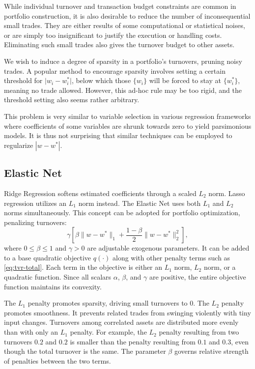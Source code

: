 \documentclass[11pt, letterpaper]{article}
\begin{document}
While individual turnover and transaction budget constraints are common in portfolio construction, it is also desirable to
reduce the number of inconsequential small trades. They are either results of some computational or statistical noises, or are
simply too insignificant to justify the execution or handling costs. Eliminating such small trades also gives the turnover
budget to other assets.

We wish to induce a degree of sparsity in a portfolio's turnovers, pruning noisy trades. A popular method to encourage sparsity
involves setting a certain threshold for $\lvert w_i - w^*_i \rvert$, below which those $\{w_i\}$ will be forced to stay at
$\{w_i^*\}$, meaning no trade allowed. However, this ad-hoc rule may be too rigid, and the threshold setting also seems rather
arbitrary.

This problem is very similar to variable selection in various regression frameworks where coefficients of some variables are
shrunk towards zero to yield parsimonious models. It is thus not surprising that similar techniques can be employed to
regularize $|w - w^*|$.

\subsection{Elastic Net}

Ridge Regression \cite{hoerl1970ridge} softens estimated coefficients through a scaled $L_2$ norm. Lasso regression
\cite{tibshirani1996lasso} utilizes an $L_1$ norm instead. The Elastic Net \cite{zou2005elasticnet} uses both $L_1$ and $L_2$
norms simultaneously. This concept can be adopted for portfolio optimization, penalizing turnovers:
\begin{equation}
	\label{elastic_net_objective}
	\gamma\left[\beta \lVert w-w^*\rVert_1 + \frac{1 - \beta}{2} \lVert w-w^*\rVert_2^2\right],
\end{equation}
where $0 \leq \beta \leq 1$ and $\gamma > 0$ are adjustable exogenous parameters. It can be added to a base quadratic objective
$q(\cdot)$ along with other penalty terms such as \eqref{eq:tvr-total}.  Each term in the objective is either an $L_1$ norm,
$L_2$ norm, or a quadratic function. Since all scalars $\alpha$, $\beta$, and $\gamma$ are positive, the entire objective
function maintains its convexity.

The $L_1$ penalty promotes sparsity, driving small turnovers to $0$. The $L_2$ penalty promotes smoothness. It prevents related
trades from swinging violently with tiny input changes. Turnovers among correlated assets are distributed more evenly than with
only an $L_1$ penalty. For example, the $L_2$ penalty resulting from two turnovers $0.2$ and $0.2$ is smaller than the penalty
resulting from $0.1$ and $0.3$, even though the total turnover is the same. The parameter $\beta$ governs relative strength of
penalties between the two terms.
\end{document}
